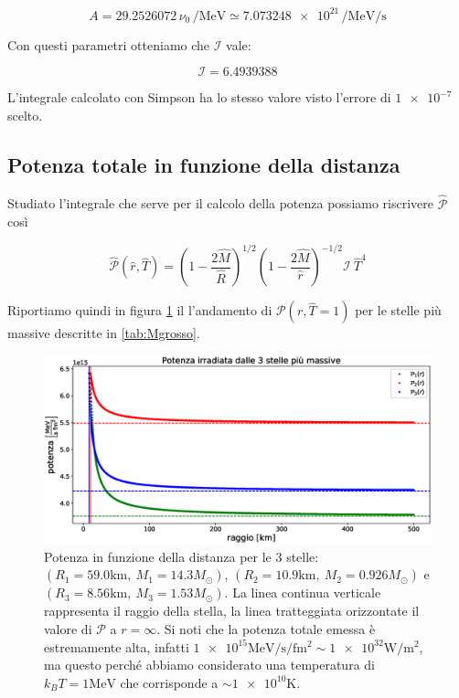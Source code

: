 \documentclass[a4paper, titlepage]{article}
\begin{document}
\begin{equation}
    A = 29.2526072 \, \nu_0 \, \unit{\per\mega\electronvolt} \simeq
    \num{7.073248e21} \, \unit{\per\mega\electronvolt\per\second}
    \label{eq:A_giusto}
\end{equation}

Con questi parametri otteniamo che $\mathcal I$ vale:

\begin{equation}
    \mathcal I = 6.4939388
    \label{eq:val_I}
\end{equation}

L'integrale calcolato con Simpson ha lo stesso valore visto l'errore di
$\num{1e-7}$ scelto.


\subsection{Potenza totale in funzione della distanza}

Studiato l'integrale che serve per il calcolo della potenza possiamo riscrivere
$\mathcal{\hat P}$ così

\begin{equation}
    \mathcal{\hat P} (\hat r, \hat T)
    = \left(1 - \frac{2 \hat M}{\hat R} \right)^{1/2}
    \left(1 - \frac{2 \hat M}{\hat r} \right)^{-1/2} \mathcal I ~ \hat T^4
    \label{eq:Pot_I}
\end{equation}

Riportiamo quindi in figura \ref{fig:Pot} il l'andamento di
$\mathcal P (r, \hat T = 1)$ per le stelle più massive descritte in
\ref{tab:Mgrosso}.

\begin{figure}[h]
    \centering
    \includegraphics[width = \textwidth]{Figures/Pot.eps}
    \caption{Potenza in funzione della distanza per le 3 stelle:
    $(R_1 = 59.0 \unit{\kilo\meter},~M_1 = 14.3 M_\odot)$,
    $(R_2 = 10.9 \unit{\kilo\meter},~M_2 = 0.926 M_\odot)$ e
    $(R_3 = 8.56 \unit{\kilo\meter},~M_3 = 1.53 M_\odot)$.
    La linea continua verticale rappresenta il raggio della stella, la linea
    tratteggiata orizzontate il valore di $\mathcal{P}$ a $r = \infty$.
    Si noti che la potenza totale emessa è estremamente alta, infatti
    $\num{1e15} \unit{\mega\electronvolt\per\second\per\femto\meter\squared}
    \sim \num{1e32} \unit{\watt\per\meter\squared}$, ma questo perché abbiamo
    considerato una temperatura di $k_B T = 1 \unit{\mega\electronvolt}$ che
    corrisponde a $\sim \num{1e10} \unit{\kelvin}$.}
    \label{fig:Pot}
\end{figure}
\end{document}
